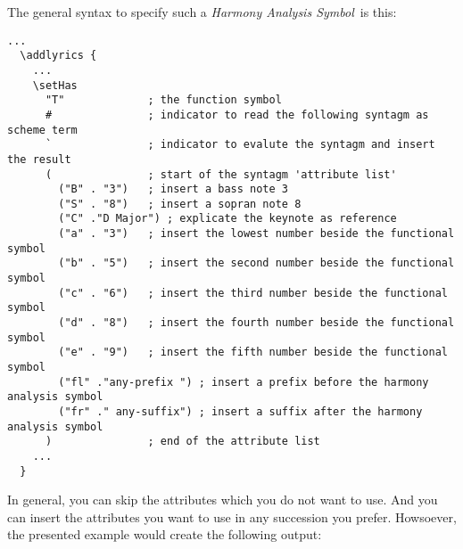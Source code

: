 \documentclass[
  DIV=calc,
  BCOR=5mm,
  12pt,
  headings=small,
  oneside,
  abstract=true,
  toc=bib,
  xcolor=dvipsnames,
  openany,
  ngerman,english]{scrartcl}
\newcommand{\has}[1]{\textit{Harmony Analysis Symbol#1}}
\begin{document}
\begin{center}
\end{center}

The general syntax to specify such a \has{}\ is this:

\begin{scriptsize}
\begin{verbatim}
...
  \addlyrics { 
    ...
    \setHas
      "T"             ; the function symbol
      #               ; indicator to read the following syntagm as scheme term
      `               ; indicator to evalute the syntagm and insert the result
      (               ; start of the syntagm 'attribute list'
        ("B" . "3")   ; insert a bass note 3
        ("S" . "8")   ; insert a sopran note 8
        ("C" ."D Major") ; explicate the keynote as reference
        ("a" . "3")   ; insert the lowest number beside the functional symbol
        ("b" . "5")   ; insert the second number beside the functional symbol
        ("c" . "6")   ; insert the third number beside the functional symbol
        ("d" . "8")   ; insert the fourth number beside the functional symbol
        ("e" . "9")   ; insert the fifth number beside the functional symbol
        ("fl" ."any-prefix ") ; insert a prefix before the harmony analysis symbol
        ("fr" ." any-suffix") ; insert a suffix after the harmony analysis symbol
      )               ; end of the attribute list
    ...
  }
\end{verbatim}
\end{scriptsize}

In general, you can skip the attributes which you do not want to use. And you
can insert the attributes you want to use in any succession you prefer.
Howsoever, the presented example would create the following output:
\end{document}
